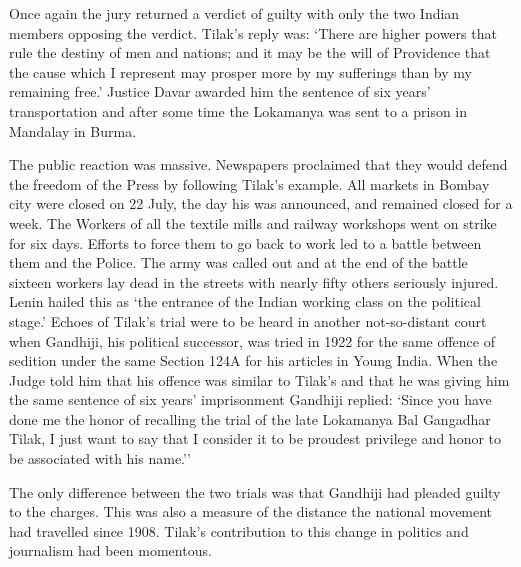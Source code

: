 Once again the jury returned a verdict of guilty with only the two Indian members opposing the verdict. Tilak's reply was: `There are higher powers that rule the destiny of men and nations; and it may be the will of Providence that the cause which I represent may prosper more by my sufferings than by my remaining free.' Justice Davar awarded him the sentence of six years' transportation and after some time the Lokamanya was sent to a prison in Mandalay in Burma.

The public reaction was massive. Newspapers proclaimed that they would defend the freedom of the Press by following Tilak's example. All markets in Bombay city were closed on 22 July, the day his was announced, and remained closed for a week. The Workers of all the textile mills and railway workshops went on strike for six days. Efforts to force them to go back to work led to a battle between them and the Police. The army was called out and at the end of the battle sixteen workers lay dead in the streets with nearly fifty others seriously injured. Lenin hailed this as `the entrance of the Indian working class on the political stage.' Echoes of Tilak's trial were to be heard in another not-so-distant court when Gandhiji, his political successor, was tried in 1922 for the same offence of sedition under the same Section 124A for his articles in Young India. When the Judge told him that his offence was similar to Tilak's and that he was giving him the same sentence of six years' imprisonment Gandhiji replied: `Since you have done me the honor of recalling the trial of the late Lokamanya Bal Gangadhar Tilak, I just want to say that I consider it to be proudest privilege and honor to be associated with his name.''

The only difference between the two trials was that Gandhiji had pleaded guilty to the charges. This was also a measure of the distance the national movement had travelled since 1908. Tilak's contribution to this change in politics and journalism had been momentous.
